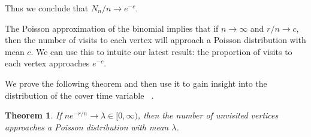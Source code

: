 \documentclass[12pt]{article}
\newtheorem{theorem}{Theorem}
\theoremstyle{definition}
\DeclareMathOperator{\cov}{\uptau_\textrm{cov}}  %
\begin{document}
Thus we conclude that $N_n/n \rightarrow e^{-c}$. 

The Poisson approximation of the binomial implies that if $n \rightarrow \infty$
and $r/n \rightarrow c$, then the number of visits to each vertex will approach
a Poisson distribution with mean $c$.
We can use this to intuite our latest result: the proportion of visits to each vertex
approaches $e^{-c}$.

We prove the following theorem and then use it to gain insight into
the distribution of the cover time variable $\cov$.
\begin{theorem}\label{thm:pois}
If $ne^{-r/n} \rightarrow \lambda \in [0, \infty)$, then the number of unvisited
vertices approaches a Poisson distribution with mean $\lambda$.
\end{theorem}
\end{document}
